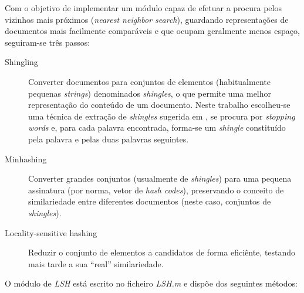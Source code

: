 \documentclass[a4paper,11pt,openright,oneside]{report}
\begin{document}
Com o objetivo de implementar um módulo capaz de efetuar a procura pelos vizinhos mais próximos (\textit{nearest neighbor search}), guardando representações de documentos mais facilmente comparáveis e que ocupam geralmente menos espaço, seguiram-se três passos:

\begin{description}
\item[Shingling]
Converter documentos para conjuntos de elementos (habitualmente pequenas \textit{strings}) denominados \textit{shingles}, o que permite uma melhor representação do conteúdo de um documento. Neste trabalho escolheu-se uma técnica de extração de \textit{shingles} sugerida em \cite{book1}, se procura por \textit{stopping words} e, para cada palavra encontrada, forma-se um \textit{shingle} constituído pela palavra e pelas duas palavras seguintes.
\item[Minhashing]
Converter grandes conjuntos (usualmente de \textit{shingles}) para uma pequena assinatura (por norma, vetor de \textit{hash codes}), preservando o conceito de similariedade entre diferentes documentos (neste caso, conjuntos de \textit{shingles}).
\item[Locality-sensitive hashing]
Reduzir o conjunto de elementos a candidatos de forma eficiênte, testando mais tarde a sua ``real'' similariedade.
\end{description}

O módulo de \textit{LSH} está escrito no ficheiro \textit{LSH.m} e dispõe dos seguintes métodos:
\end{document}

